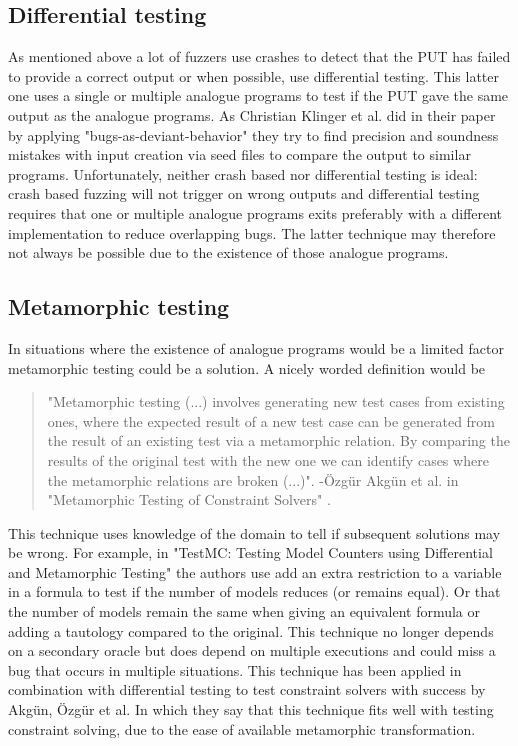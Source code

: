 \subsection{Differential testing}
\label{fuzzing:DifferentialTesting}
As mentioned above a lot of fuzzers use crashes to detect that the PUT has failed to provide a correct output or when possible, use differential testing. This latter one uses a single or multiple analogue programs to test if the PUT gave the same output as the analogue programs. As Christian Klinger et al. did in their paper \cite{48klinger2019differentially} by applying "bugs-as-deviant-behavior" they try to find precision and soundness mistakes with input creation via seed files to compare the output to similar programs. 
Unfortunately, neither crash based nor differential testing is ideal: crash based fuzzing will not trigger on wrong outputs and differential testing requires that one or multiple analogue programs exits preferably with a different implementation to reduce overlapping bugs. The latter technique may therefore not always be possible due to the existence of those analogue programs.

\subsection{Metamorphic testing}
\label{fuzzing:MetamorphicTesting}
In situations where the existence of analogue programs would be a limited factor metamorphic testing could be a solution. A nicely worded definition would be 

\begin{quote}
	\label{quote:MetaMorphic}
	"Metamorphic testing (...) involves generating new test cases from existing ones, where the expected result of a new test case can be generated from the result of an existing test via a metamorphic relation. By comparing the results of the
	original test with the new one we can identify cases where the metamorphic relations are broken (...)".
	\newline
	-\"{O}zg\"{u}r Akg\"{u}n et al. in "Metamorphic Testing of Constraint Solvers" \cite{50akgun2018metamorphic}.
\end{quote}

\noindent This technique uses knowledge of the domain to tell if subsequent solutions may be wrong. For example, in "TestMC: Testing Model Counters using Differential and Metamorphic Testing" \cite{49usman2020testmc} the authors use add an extra restriction to a variable in a formula to test if the number of models reduces (or remains equal). Or that the number of models remain the same when giving an equivalent formula or adding a tautology compared to the original.  This technique no longer depends on a secondary oracle but does depend on multiple executions and could miss a bug that occurs in multiple situations. This technique has been applied in combination with differential testing to test constraint solvers with success \cite{50akgun2018metamorphic} by Akg{\"u}n, {\"O}zg{\"u}r et al. In which they say that this technique fits well with testing constraint solving, due to the ease of available metamorphic transformation.

